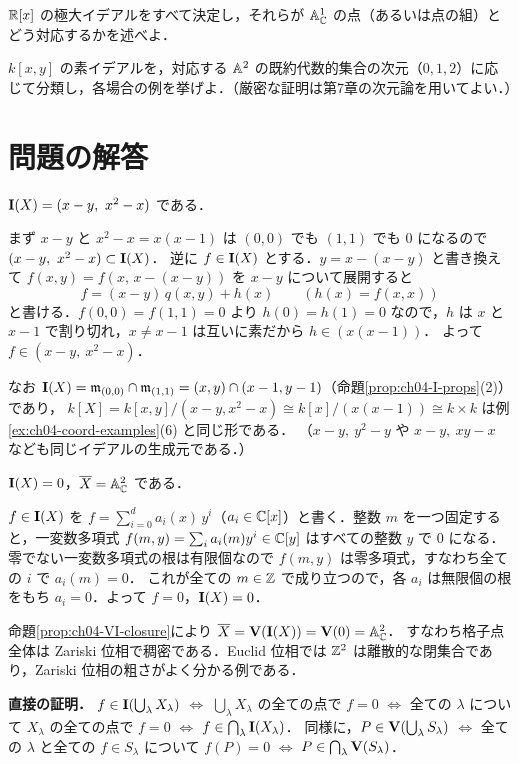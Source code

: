  $\mathbb{R}[x]$ の極大イデアルをすべて決定し，それらが $\mathbb{A}^1_{\mathbb{C}}$ の点（あるいは点の組）とどう対応するかを述べよ．

 $k[x,y]$ の素イデアルを，対応する $\mathbb{A}^2$ の既約代数的集合の次元（$0,1,2$）に応じて分類し，各場合の例を挙げよ．（厳密な証明は第7章の次元論を用いてよい．）

\section*{問題の解答}

$\mathbf{I}(X)=(x-y,\ x^2-x)$ である．

まず $x-y$ と $x^2-x=x(x-1)$ は $(0,0)$ でも $(1,1)$ でも $0$ になるので $(x-y,\ x^2-x)\subset\Ideal(X)$．
逆に $f\in\mathbf{I}(X)$ とする．$y=x-(x-y)$ と書き換えて $f(x,y)=f(x,\,x-(x-y))$ を $x-y$ について展開すると
\[
  f=(x-y)\,q(x,y)+h(x)\qquad(h(x)=f(x,x))
\]
と書ける．$f(0,0)=f(1,1)=0$ より $h(0)=h(1)=0$ なので，$h$ は $x$ と $x-1$ で割り切れ，$x\ne x-1$ は互いに素だから $h\in(x(x-1))$．
よって $f\in(x-y,\ x^2-x)$．

なお $\mathbf{I}(X)=\mathfrak{m}_{(0,0)}\cap\mathfrak{m}_{(1,1)}=(x,y)\cap(x-1,y-1)$（命題\ref{prop:ch04-I-props}(2)）であり，
$k[X]=k[x,y]/(x-y,x^2-x)\cong k[x]/(x(x-1))\cong k\times k$ は例\ref{ex:ch04-coord-examples}(6) と同じ形である．
（$x-y,\ y^2-y$ や $x-y,\ xy-x$ なども同じイデアルの生成元である．）

$\mathbf{I}(X)=0$，$\overline X=\mathbb{A}^2_{\mathbb{C}}$ である．

$f\in\mathbf{I}(X)$ を $f=\sum_{i=0}^d a_i(x)\,y^i$（$a_i\in\mathbb{C}[x]$）と書く．整数 $m$ を一つ固定すると，一変数多項式 $f(m,y)=\sum_ia_i(m)y^i\in\mathbb{C}[y]$ はすべての整数 $y$ で $0$ になる．
零でない一変数多項式の根は有限個なので $f(m,y)$ は零多項式，すなわち全ての $i$ で $a_i(m)=0$．
これが全ての $m\in\mathbb{Z}$ で成り立つので，各 $a_i$ は無限個の根をもち $a_i=0$．よって $f=0$，$\mathbf{I}(X)=0$．

命題\ref{prop:ch04-VI-closure}により $\overline X=\mathbf{V}(\mathbf{I}(X))=\mathbf{V}(0)=\mathbb{A}^2_{\mathbb{C}}$．
すなわち格子点全体は Zariski 位相で稠密である．Euclid 位相では $\mathbb{Z}^2$ は離散的な閉集合であり，Zariski 位相の粗さがよく分かる例である．

\textbf{直接の証明．}
$f\in\mathbf{I}(\bigcup_\lambda X_\lambda)$ $\iff$ $\bigcup_\lambda X_\lambda$ の全ての点で $f=0$ $\iff$ 全ての $\lambda$ について $X_\lambda$ の全ての点で $f=0$ $\iff$ $f\in\bigcap_\lambda\mathbf{I}(X_\lambda)$．
同様に，$P\in\mathbf{V}(\bigcup_\lambda S_\lambda)$ $\iff$ 全ての $\lambda$ と全ての $f\in S_\lambda$ について $f(P)=0$ $\iff$ $P\in\bigcap_\lambda\mathbf{V}(S_\lambda)$．

